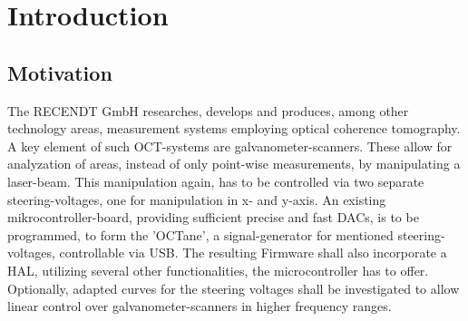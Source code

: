 \chapter{Introduction}
\label{cha:Introduction}

\section{Motivation}
The RECENDT GmbH researches, develops and produces, among other technology areas, measurement systems employing optical coherence tomography. A key element of such OCT-systems are galvanometer-scanners.  These allow for analyzation of areas, instead of only point-wise measurements, by manipulating a laser-beam. This manipulation again, has to be controlled via two separate steering-voltages, one for manipulation in x- and y-axis. An existing mikrocontroller-board, providing sufficient precise and fast DACs, is to be programmed, to form the 'OCTane', a signal-generator for mentioned steering-voltages, controllable via USB. The resulting Firmware shall also incorporate a HAL, utilizing several other functionalities, the microcontroller has to offer. Optionally, adapted curves for the steering voltages shall be investigated to allow linear control over galvanometer-scanners in higher frequency ranges.

